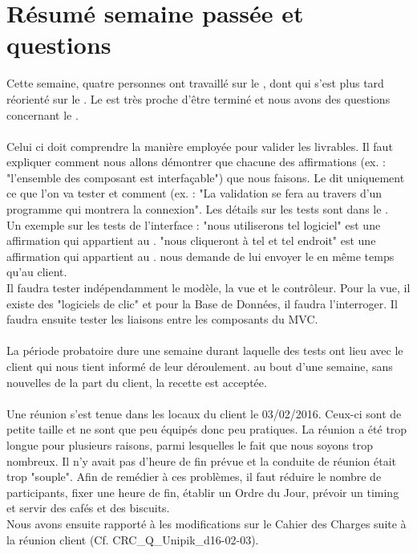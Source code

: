\documentclass [a4paper] {article}
\begin{document}
\section{Résumé semaine passée et questions}
Cette semaine, quatre personnes ont travaillé sur le \DSE{}, dont \Michel{} qui s'est plus tard réorienté sur le \PTV{}. Le \DSECourt{} est très proche d'être terminé et nous avons des questions concernant le \PTVCourt{}.
\paragraph{}
Celui ci doit comprendre la manière employée pour valider les livrables. Il faut expliquer comment nous allons démontrer que chacune des affirmations (ex. : "l'ensemble des composant est interfaçable") que nous faisons. Le \PTVCourt{} dit uniquement ce que l'on va tester et comment (ex. : "La validation se fera au travers d'un programme qui montrera la connexion". Les détails sur les tests sont dans le \CDR{}.
\\
Un exemple sur les tests de l'interface : "nous utiliserons tel logiciel" est une affirmation qui appartient au \PTVCourt{}. "nous cliqueront à tel et tel endroit" est une affirmation qui appartient au \CDR{}. \nomTuteurPedago{} nous demande de lui envoyer le \PTV{} en même temps qu'au client.
\\
Il faudra tester indépendamment le modèle, la vue et le contrôleur. Pour la vue, il existe des "logiciels de clic" et pour la Base de Données, il faudra l'interroger. Il faudra ensuite tester les liaisons entre les composants du MVC.
\paragraph{}
La période probatoire dure une semaine durant laquelle des tests ont lieu avec le client qui nous tient informé de leur déroulement. au bout d'une semaine, sans nouvelles de la part du client, la recette est acceptée.
\paragraph{}
Une réunion s'est tenue dans les locaux du client le 03/02/2016. Ceux-ci sont de petite taille et ne sont que peu équipés donc peu pratiques. La réunion a été trop longue pour plusieurs raisons, parmi lesquelles le fait que nous soyons trop nombreux. Il n'y avait pas d'heure de fin prévue et la conduite de réunion était trop "souple". Afin de remédier à ces problèmes, il faut réduire le nombre de participants, fixer une heure de fin, établir un Ordre du Jour, prévoir un timing et servir des cafés et des biscuits.
\\
Nous avons ensuite rapporté à \nomTuteurPedago{} les modifications sur le Cahier des Charges suite à la réunion client (Cf. CRC\_Q\_Unipik\_d16-02-03).
\end{document}
